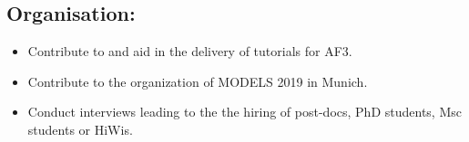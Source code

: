 \documentclass{article}
\begin{document}
\begin{appendices}
\subsection{Organisation:}

\begin{itemize}
  \item Contribute to and aid in the delivery of tutorials for AF3.
  \item Contribute to the organization of MODELS 2019 in Munich.
  \item Conduct interviews leading to the the hiring of post-docs, PhD students,
  Msc students or HiWis.
\end{itemize}

\end{appendices}



\end{document}
